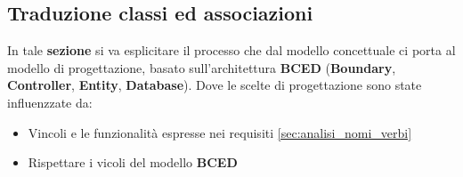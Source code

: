 \subsection{Traduzione classi ed associazioni}
\label{sec:prg_traduzione}

In tale \textbf{sezione} si va esplicitare il processo che dal modello concettuale ci porta al modello di progettazione, basato sull'architettura \textbf{BCED} (\textbf{Boundary}, \textbf{Controller}, \textbf{Entity}, \textbf{Database}).
Dove le scelte di progettazione sono state influenzzate da:
\begin{itemize}
\item Vincoli e le funzionalità espresse nei requisiti \ref{sec:analisi_nomi_verbi}
\item Rispettare i vicoli del modello \textbf{BCED}
\end{itemize}

